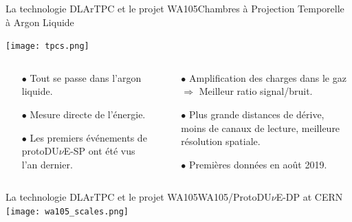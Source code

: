     \begin{frame}{La technologie DLArTPC et le projet WA105}{Chambres à Projection Temporelle à Argon Liquide}
    	\begin{scriptsize}
    			\texttt{[image: tpcs.png]}\\\vfill
    			\begin{columns}
    				\begin{column}{0.5\textwidth}
    					\begin{itemize}
    						\item[$\bullet$] Tout se passe dans l'argon liquide.
    						\item[$\bullet$] Mesure directe de l'énergie.
    						\item[$\bullet$] Les premiers événements de protoDU$\nu$E-SP ont été vus l'an dernier.
    					\end{itemize}
    				\end{column}\hfill
    				\begin{column}{0.5\textwidth}
    					\begin{itemize}
    						\item[$\bullet$] Amplification des charges dans le gaz\\$\Rightarrow$ Meilleur ratio signal/bruit.
    						\item[$\bullet$] Plus grande distances de dérive, moins de canaux de lecture, meilleure résolution spatiale.
    						\item[$\bullet$] Premières données en août 2019.
    					\end{itemize}
    				\end{column}
    			\end{columns}
    	\end{scriptsize}
    \end{frame}

    \begin{frame}{La technologie DLArTPC et le projet WA105}{WA105/\texorpdfstring{ProtoDU$\nu$E}{ProtoDUNE}-DP at CERN}
        \centering
    	\vspace{-0.5cm}\hspace{-0.4cm}\texttt{[image: wa105\_scales.png]}
    \end{frame}

